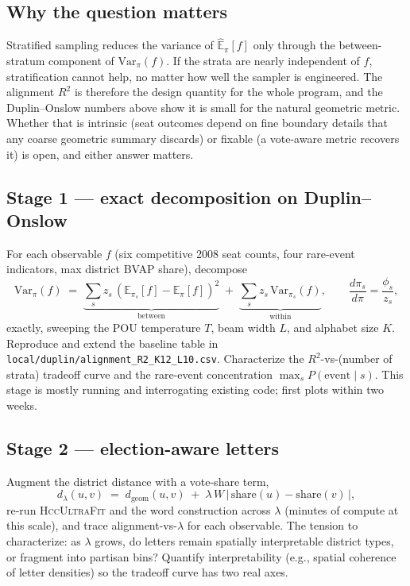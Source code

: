 \documentclass[11pt]{article}
\newcommand{\hccultra}{\textsc{HccUltraFit}}
\begin{document}
\subsection*{Why the question matters}

Stratified sampling reduces the variance of $\hat{\mathbb{E}}_\pi[f]$
only through the between-stratum component of $\mathrm{Var}_\pi(f)$.
If the strata are nearly independent of $f$, stratification cannot
help, no matter how well the sampler is engineered. The alignment
$R^2$ is therefore the design quantity for the whole program, and the
Duplin--Onslow numbers above show it is small for the natural
geometric metric. Whether that is intrinsic (seat outcomes depend on
fine boundary details that any coarse geometric summary discards) or
fixable (a vote-aware metric recovers it) is open, and either answer
matters.

\subsection*{Stage 1 --- exact decomposition on Duplin--Onslow}

For each observable $f$ (six competitive 2008 seat counts, four
rare-event indicators, max district BVAP share), decompose
\[
  \mathrm{Var}_\pi(f)
  \;=\;
  \underbrace{\textstyle\sum_s z_s\,(\mathbb{E}_{\pi_s}[f]-\mathbb{E}_\pi[f])^2}_{\text{between}}
  \;+\;
  \underbrace{\textstyle\sum_s z_s\,\mathrm{Var}_{\pi_s}(f)}_{\text{within}},
  \qquad
  \frac{d\pi_s}{d\pi}=\frac{\phi_s}{z_s},
\]
exactly, sweeping the POU temperature $T$, beam width $L$, and
alphabet size $K$. Reproduce and extend the baseline table in
\texttt{local/duplin/alignment\_R2\_K12\_L10.csv}. Characterize the
$R^2$-vs-(number of strata) tradeoff curve and the rare-event
concentration $\max_s P(\text{event}\mid s)$. This stage is mostly
running and interrogating existing code; first plots within two weeks.

\subsection*{Stage 2 --- election-aware letters}

Augment the district distance with a vote-share term,
\[
  d_\lambda(u,v) \;=\; d_{\mathrm{geom}}(u,v)
  \;+\; \lambda\, W \,\bigl|\,\mathrm{share}(u)-\mathrm{share}(v)\,\bigr|,
\]
re-run \hccultra{} and the word construction across $\lambda$ (minutes
of compute at this scale), and trace alignment-vs-$\lambda$ for each
observable. The tension to characterize: as $\lambda$ grows, do
letters remain spatially interpretable district types, or fragment
into partisan bins? Quantify interpretability (e.g., spatial
coherence of letter densities) so the tradeoff curve has two real
axes.
\end{document}
